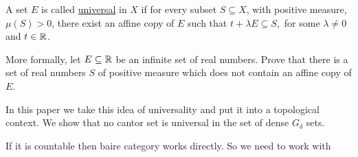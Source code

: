 \begin{definition}[Universal]
    A set $E$ is called \underline{universal} in $X$ if for every subset $S \subseteq X$, with positive measure, $\mu (S) > 0$, there exist an affine copy of $E$ such that $t+\lambda E \subseteq S,$ for some $\lambda \neq 0$ and $t \in \mathbb{R}$.  
\end{definition}


More formally, let $E\subseteq \mathbb{R}$ be an infinite set of real numbers.  Prove that there is a set of real numbers $S$ of positive measure which does not contain an affine copy of $E$.  

In this paper we take this idea of universality and put it into a topological context.  We show that no cantor set is universal in the set of dense $G_\delta$ sets.  


If it is countable then baire category works directly.  So we need to work with 




